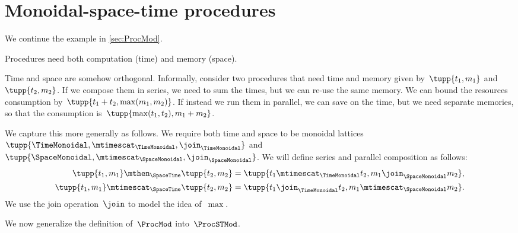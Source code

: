 \section{Monoidal-space-time procedures}
\label{subsec:monoidal-space-time}
We continue the example in \cref{sec:ProcMod}.

Procedures need both computation (time) and memory (space).

Time and space are somehow orthogonal.
%
Informally, consider two procedures that need time and memory given by~$\tupp{t_1,m_1}$ and~$\tupp{t_2, m_2}$.
If we compose them in series, we need to sum the times, but we can re-use the same memory.
We can bound the resources consumption by~$\tupp{t_1+t_2,\max(m_1, m_2)}$.
If instead we run them in parallel, we can save on the time, but we need separate memories, so that the consumption is~$\tupp{\max(t_1,t_2), m_1 + m_2}$.

We capture this more generally as follows.
We require both time and space to be monoidal lattices~$\tupp{\TimeMonoidal, \mtimescat_{\TimeMonoidal}, \join_{\TimeMonoidal}}$ and~$\tupp{\SpaceMonoidal, \mtimescat_{\SpaceMonoidal}, \join_{\SpaceMonoidal}}$.
%
We will define series and parallel composition as follows:
\begin{equation}
    \begin{aligned}
        \tupp{t_1,m_1} \mthen_{\SpaceTime}  \tupp{t_2,m_2}     & = \tupp{t_1 \mtimescat_{\TimeMonoidal} t_2, m_1 \join_{\SpaceMonoidal} m_2}, \\
        \tupp{t_1,m_1} \mtimescat_{\SpaceTime}  \tupp{t_2,m_2} & = \tupp{t_1 \join_{\TimeMonoidal} t_2, m_1 \mtimescat_{\SpaceMonoidal} m_2}.
    \end{aligned}
\end{equation}
We use the join operation~$\join$ to model the idea of~$\max$.

We now generalize the definition of~$\ProcMod$ into~$\ProcSTMod$.

